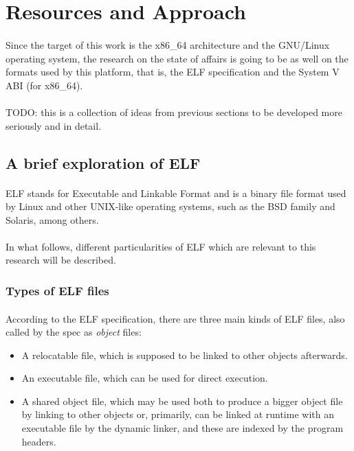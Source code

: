 \documentclass[12pt]{article}
\begin{document}
	\section{Resources and Approach}
	
	\paragraph{}Since the target of this work is the x86\_64 architecture and the GNU/Linux operating system, the research on the state of affairs is going to be as well on the formats used by this platform, that is, the ELF specification and the System V ABI (for x86\_64).
	\paragraph{}TODO: this is a collection of ideas from previous sections to be developed more seriously and in detail.


	\subsection{A brief exploration of ELF}
	
	\paragraph{}ELF stands for Executable and Linkable Format and is a binary file format used by Linux and other UNIX-like operating systems, such as the BSD family and Solaris, among others.
	\paragraph{}In what follows, different particularities of ELF which are relevant to this research will be described.
	
	\subsubsection{Types of ELF files}
	
	\paragraph{}According to the ELF specification\cite{elf-spec}, there are three main kinds of ELF files, also called by the spec as \textit{object} files:
	\begin{itemize}
		\item A relocatable file, which is supposed to be linked to other objects afterwards.
		\item An executable file, which can be used for direct execution.
		\item A shared object file, which may be used both to produce a bigger object file by linking to other objects or, primarily, can be linked at runtime with an executable file by the dynamic linker, and these are indexed by the program headers.
	\end{itemize}
\end{document}
